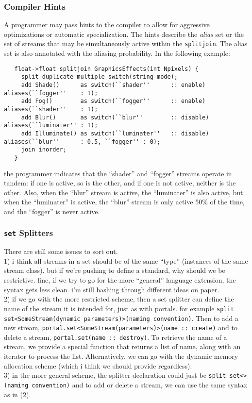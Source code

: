 \documentclass{tr}
\begin{document}

\subsubsection{Compiler Hints}

A programmer  may pass hints to  the compiler to  allow for aggressive
optimizations or automatic specialization. The hints describe the {\it
alias} set  or the  set of streams  that may be  simultaneously active
within the \verb+splitjoin+. The alias  set is also annotated with the
aliasing probability. In the following example:
\begin{verbatim}
   float->float splitjoin GraphicsEffects(int Npixels) {
     split duplicate multiple switch(string mode);
     add Shade()      as switch(``shader''      :: enable)  aliases(``fogger''    : 1);
     add Fog()        as switch(``fogger''      :: enable)  aliases(``shader''    : 1);
     add Blur()       as switch(``blur''        :: disable) aliases(``luminater'' : 1);
     add Illuminate() as switch(``luminater''   :: disable) aliases(``blur''      : 0.5, ``fogger'' : 0);
     join inorder;
   }
\end{verbatim}
the programmer  indicates that  the ``shader'' and  ``fogger'' streams
operate in tandem:  if one is active,  so is the other, and  if one is
not active,  neither is the other.  Also, when the  ``blur'' stream is
active, the  ``luminater'' is also active, but  when the ``luminater''
is active,  the ``blur'' stream is  only active 50\% of  the time, and
the ``fogger'' is never active.

\subsubsection {\texttt{set} Splitters}

There are still some issues to sort out.\\
1) i think all streams in a set should be of the same ``type''
(instances of the same stream class). but if we're pushing to define a
standard, why should we be restrictive. fine, if we try to go for the
more ``general'' language extension, the syntax gets less clean. i'm
still hashing through different ideas on paper.\\
2) if we go with the more restricted scheme, then a set splitter can
define the name of the stream it is intended for, just as with
portals. for example
\verb+split set<SomeStream(dynamic parameters)>(naming convention)+. Then to add a
new stream,
\verb+portal.set<SomeStream(parameters)>(name :: create)+ and to delete a
stream,
\verb+portal.set(name :: destroy)+. To retrieve the name of a stream, we provide
a special function that returns a list of name, along with an iterator
to process the list. Alternatively, we can go with the dynamic memory
allocation scheme (which i think we should provide regardless).\\
3) in the more general scheme, the splitter declaration could just be
\verb+split set<>(naming convention)+ and to add or delete a stream, we
can use the same syntax as in (2).
\end{document}

